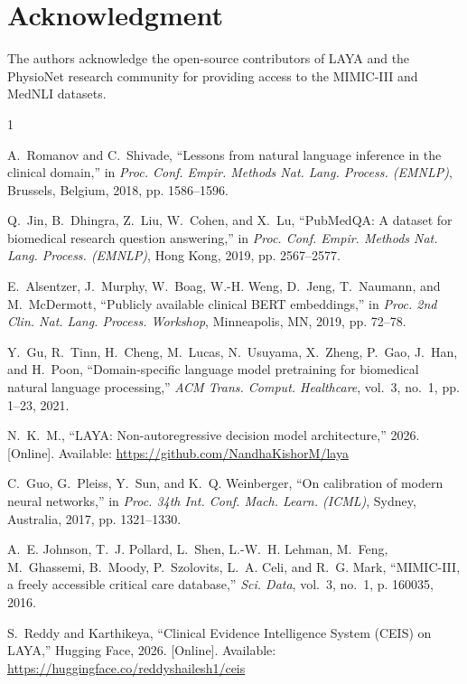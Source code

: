 \documentclass[10pt,conference]{IEEEtran}
\begin{document}
\section*{Acknowledgment}
The authors acknowledge the open-source contributors of LAYA and the PhysioNet research community for providing access to the MIMIC-III and MedNLI datasets.


\begin{thebibliography}{1}

A.~Romanov and C.~Shivade, ``Lessons from natural language inference in the clinical domain,'' in \emph{Proc. Conf. Empir. Methods Nat. Lang. Process. (EMNLP)}, Brussels, Belgium, 2018, pp. 1586--1596.

Q.~Jin, B.~Dhingra, Z.~Liu, W.~Cohen, and X.~Lu, ``{PubMedQA}: A dataset for biomedical research question answering,'' in \emph{Proc. Conf. Empir. Methods Nat. Lang. Process. (EMNLP)}, Hong Kong, 2019, pp. 2567--2577.

E.~Alsentzer, J.~Murphy, W.~Boag, W.-H. Weng, D.~Jeng, T.~Naumann, and M.~McDermott, ``Publicly available clinical {BERT} embeddings,'' in \emph{Proc. 2nd Clin. Nat. Lang. Process. Workshop}, Minneapolis, MN, 2019, pp. 72--78.

Y.~Gu, R.~Tinn, H.~Cheng, M.~Lucas, N.~Usuyama, X.~Zheng, P.~Gao, J.~Han, and H.~Poon, ``Domain-specific language model pretraining for biomedical natural language processing,'' \emph{ACM Trans. Comput. Healthcare}, vol.~3, no.~1, pp. 1--23, 2021.

N.~K.~M., ``{LAYA}: Non-autoregressive decision model architecture,'' 2026. [Online]. Available: \url{https://github.com/NandhaKishorM/laya}

C.~Guo, G.~Pleiss, Y.~Sun, and K.~Q. Weinberger, ``On calibration of modern neural networks,'' in \emph{Proc. 34th Int. Conf. Mach. Learn. (ICML)}, Sydney, Australia, 2017, pp. 1321--1330.

A.~E. Johnson, T.~J. Pollard, L.~Shen, L.-W.~H. Lehman, M.~Feng, M.~Ghassemi, B.~Moody, P.~Szolovits, L.~A. Celi, and R.~G. Mark, ``{MIMIC-III}, a freely accessible critical care database,'' \emph{Sci. Data}, vol.~3, no.~1, p. 160035, 2016.

S.~Reddy and Karthikeya, ``Clinical Evidence Intelligence System ({CEIS}) on {LAYA},'' Hugging Face, 2026. [Online]. Available: \url{https://huggingface.co/reddyshailesh1/ceis}

\end{thebibliography}
\end{document}
